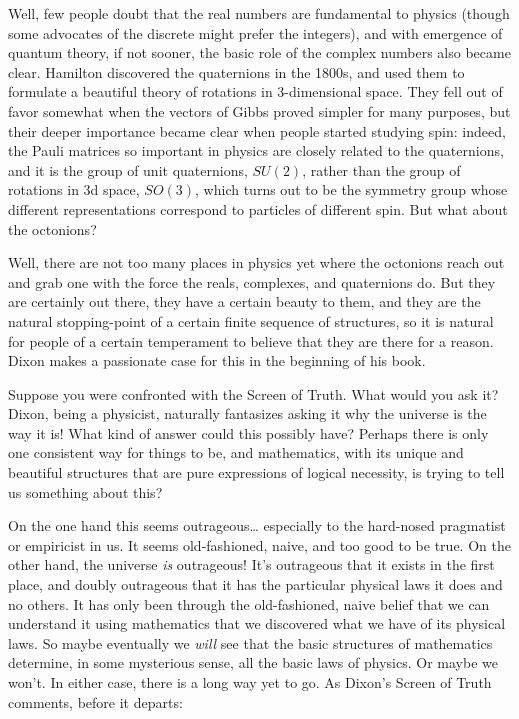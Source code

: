 \documentclass{article}
\begin{document}
Well, few people doubt that the real numbers are fundamental to physics
(though some advocates of the discrete might prefer the integers), and
with emergence of quantum theory, if not sooner, the basic role of the
complex numbers also became clear. Hamilton discovered the quaternions
in the 1800s, and used them to formulate a beautiful theory of rotations
in 3-dimensional space. They fell out of favor somewhat when the vectors
of Gibbs proved simpler for many purposes, but their deeper importance
became clear when people started studying spin: indeed, the Pauli
matrices so important in physics are closely related to the quaternions,
and it is the group of unit quaternions, \(SU(2)\), rather than the
group of rotations in 3d space, \(SO(3)\), which turns out to be the
symmetry group whose different representations correspond to particles
of different spin. But what about the octonions?

Well, there are not too many places in physics yet where the octonions
reach out and grab one with the force the reals, complexes, and
quaternions do. But they are certainly out there, they have a certain
beauty to them, and they are the natural stopping-point of a certain
finite sequence of structures, so it is natural for people of a certain
temperament to believe that they are there for a reason. Dixon makes a
passionate case for this in the beginning of his book.

Suppose you were confronted with the Screen of Truth. What would you ask
it? Dixon, being a physicist, naturally fantasizes asking it why the
universe is the way it is! What kind of answer could this possibly have?
Perhaps there is only one consistent way for things to be, and
mathematics, with its unique and beautiful structures that are pure
expressions of logical necessity, is trying to tell us something about
this?

On the one hand this seems outrageous\ldots{} especially to the
hard-nosed pragmatist or empiricist in us. It seems old-fashioned,
naive, and too good to be true. On the other hand, the universe
\emph{is} outrageous! It's outrageous that it exists in the first place,
and doubly outrageous that it has the particular physical laws it does
and no others. It has only been through the old-fashioned, naive belief
that we can understand it using mathematics that we discovered what we
have of its physical laws. So maybe eventually we \emph{will} see that
the basic structures of mathematics determine, in some mysterious sense,
all the basic laws of physics. Or maybe we won't. In either case, there
is a long way yet to go. As Dixon's Screen of Truth comments, before it
departs:
\end{document}

